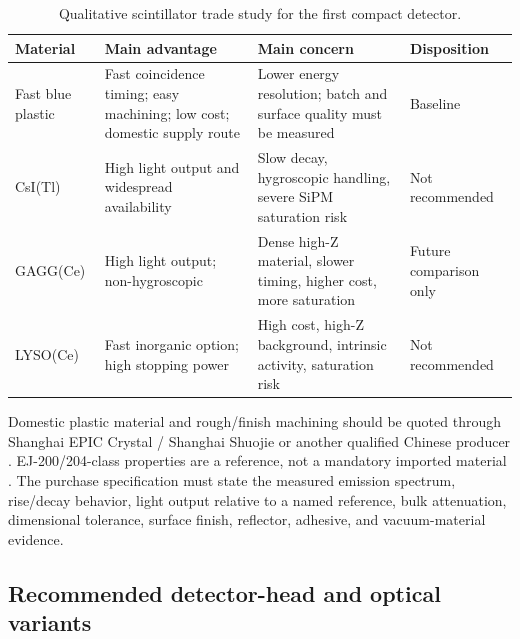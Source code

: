 \documentclass[10pt,letterpaper]{article}
\begin{document}
\begin{table}[htbp]
  \centering
  \small
  \caption{Qualitative scintillator trade study for the first compact detector.}
  \begin{tabularx}{\textwidth}{L{0.15\textwidth}Y Y L{0.17\textwidth}}
    \toprule
    Material & Main advantage & Main concern & Disposition \\
    \midrule
    Fast blue plastic & Fast coincidence timing; easy machining; low cost; domestic supply route &
      Lower energy resolution; batch and surface quality must be measured & Baseline \\
    CsI(Tl) & High light output and widespread availability &
      Slow decay, hygroscopic handling, severe SiPM saturation risk & Not recommended \\
    GAGG(Ce) & High light output; non-hygroscopic &
      Dense high-Z material, slower timing, higher cost, more saturation & Future comparison only \\
    LYSO(Ce) & Fast inorganic option; high stopping power &
      High cost, high-Z background, intrinsic activity, saturation risk & Not recommended \\
    \bottomrule
  \end{tabularx}
\end{table}

Domestic plastic material and rough/finish machining should be quoted through Shanghai EPIC
Crystal / Shanghai Shuojie or another qualified Chinese producer
\cite{epic_plastic}. EJ-200/204-class properties are a reference, not a mandatory imported
material \cite{eljen_plastic}. The purchase specification must state the measured emission
spectrum, rise/decay behavior, light output relative to a named reference, bulk attenuation,
dimensional tolerance, surface finish, reflector, adhesive, and vacuum-material evidence.

\subsection{Recommended detector-head and optical variants}
\end{document}

